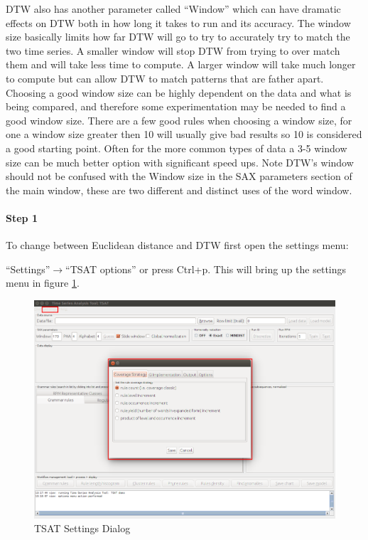 \documentclass[titlepage, letterpaper, 12pt]{article}
\begin{document}
DTW also has another parameter called ``Window'' which can have dramatic effects on DTW both in how long it takes to run and its accuracy. The window size basically limits how far DTW will go to try to accurately try to match the two time series. A smaller window will stop DTW from trying to over match them and will take less time to compute. A larger window will take much longer to compute but can allow DTW to match patterns that are father apart. Choosing a good window size can be highly dependent on the data and what is being compared, and therefore some experimentation may be needed to find a good window size. There are a few good rules when choosing a window size, for one a window size greater then 10 will usually give bad results so 10 is considered a good starting point. Often for the more common types of data a 3-5 window size can be much better option with significant speed ups. Note DTW's window should not be confused with the Window size in the SAX parameters section of the main window, these are two different and distinct uses of the word window. 

\paragraph{Step 1}
To change between Euclidean distance and DTW first open the settings menu:

``Settings''$\rightarrow$``TSAT options'' or press Ctrl+p. This will bring up the settings menu in figure \ref{fig:TSAT-settings-dialog}.

\begin{figure}[H]
	\includegraphics[width=\textwidth]{TSAT-settings-dialog}
	\caption{TSAT Settings Dialog}
	\label{fig:TSAT-settings-dialog}
\end{figure}
\end{document}
